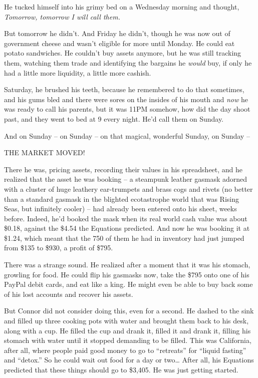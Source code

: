 He tucked himself into his grimy bed on a Wednesday morning and
thought, \emph{Tomorrow, tomorrow I will call them.}

But tomorrow he didn't. And Friday he didn't, though he was now out
of government cheese and wasn't eligible for more until Monday. He
could eat potato sandwiches. He couldn't buy assets anymore, but he
was still tracking them, watching them trade and identifying the
bargains he \emph{would} buy, if only he had a little more
liquidity, a little more cashish.

Saturday, he brushed his teeth, because he remembered to do that
sometimes, and his gums bled and there were sores on the insides of
his mouth and \emph{now} he was ready to call his parents, but it
was 11PM somehow, how did the day shoot past, and they went to bed
at 9 every night. He'd call them on Sunday.

And on Sunday -- on Sunday -- on that magical, wonderful Sunday, on
Sunday --

THE MARKET MOVED!

There he was, pricing assets, recording their values in his
spreadsheet, and he realized that the asset he was booking -- a
steampunk leather gasmask adorned with a cluster of huge leathery
ear-trumpets and brass cogs and rivets (no better than a standard
gasmask in the blighted ecotastrophe world that was Rising Seas,
but infinitely cooler) -- had already been entered onto his sheet,
weeks before. Indeed, he'd booked the mask when its real world cash
value was about \$0.18, against the \$4.54 the Equations predicted.
And now he was booking it at \$1.24, which meant that the 750 of
them he had in inventory had just jumped from \$135 to \$930, a
profit of \$795.

There was a strange sound. He realized after a moment that it was
his stomach, growling for food. He could flip his gasmasks now,
take the \$795 onto one of his PayPal debit cards, and eat like a
king. He might even be able to buy back some of his lost accounts
and recover his assets.

But Connor did not consider doing this, even for a second. He
dashed to the sink and filled up three cooking pots with water and
brought them back to his desk, along with a cup. He filled the cup
and drank it, filled it and drank it, filling his stomach with
water until it stopped demanding to be filled. This was California,
after all, where people paid good money to go to ``retreats'' for
``liquid fasting'' and ``detox.'' So he could wait out food for a day
or two\ldots{} After all, his Equations predicted that these things
should go to \$3,405. He was just getting started.


